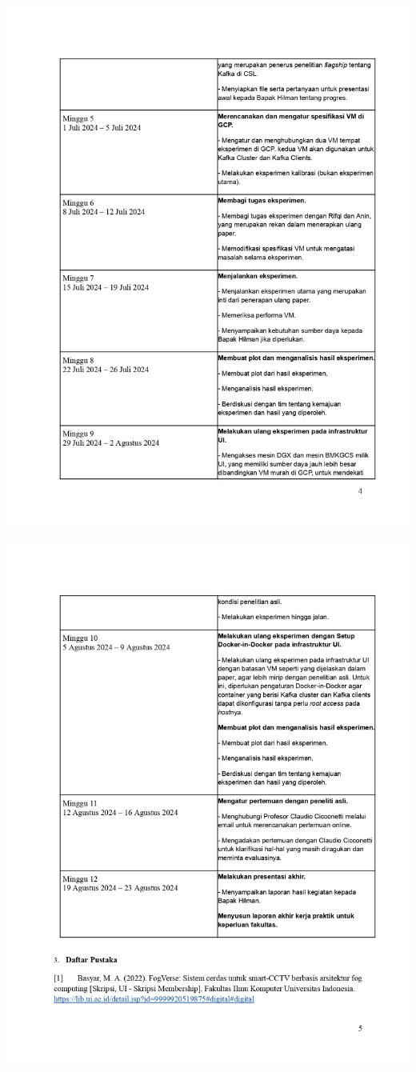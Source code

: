 \includegraphics[width=1\textwidth]{assets/pics/KAKP_Bryan Raihan Ilman_2106704351_signed_page-0004.jpg}

\includegraphics[width=1\textwidth]{assets/pics/KAKP_Bryan Raihan Ilman_2106704351_signed_page-0005.jpg}

